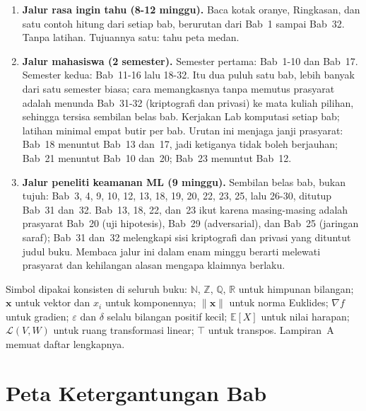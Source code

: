 \documentclass[11pt,a4paper,oneside]{book}
\theoremstyle{definition}
\theoremstyle{plain}
\theoremstyle{remark}
\begin{document}
\begin{enumerate}
  \item \textbf{Jalur rasa ingin tahu (8-12 minggu).} Baca kotak oranye, Ringkasan,
        dan satu contoh hitung dari setiap bab, berurutan dari Bab~1 sampai Bab~32.
        Tanpa latihan. Tujuannya satu: tahu peta medan.
  \item \textbf{Jalur mahasiswa (2 semester).} Semester pertama: Bab~1-10 dan
        Bab~17. Semester kedua: Bab~11-16 lalu 18-32. Itu dua puluh satu bab, lebih
        banyak dari satu semester biasa; cara memangkasnya tanpa memutus prasyarat
        adalah menunda Bab~31-32 (kriptografi dan privasi) ke mata kuliah pilihan,
        sehingga tersisa sembilan belas bab. Kerjakan Lab komputasi setiap bab;
        latihan minimal empat butir per bab. Urutan ini menjaga janji prasyarat:
        Bab~18 menuntut Bab~13 dan~17, jadi ketiganya tidak boleh berjauhan; Bab~21
        menuntut Bab~10 dan~20; Bab~23 menuntut Bab~12.
  \item \textbf{Jalur peneliti keamanan ML (9 minggu).} Sembilan belas bab, bukan
        tujuh: Bab~3, 4, 9, 10, 12, 13, 18, 19, 20, 22, 23, 25, lalu 26-30, ditutup
        Bab~31 dan~32. Bab~13, 18, 22, dan~23 ikut karena masing-masing adalah
        prasyarat Bab~20 (uji hipotesis), Bab~29 (adversarial), dan Bab~25 (jaringan
        saraf); Bab~31 dan~32 melengkapi sisi kriptografi dan privasi yang dituntut
        judul buku. Membaca jalur ini dalam enam minggu berarti melewati prasyarat
        dan kehilangan alasan mengapa klaimnya berlaku.
\end{enumerate}

Simbol dipakai konsisten di seluruh buku: $\mathbb{N}$, $\mathbb{Z}$, $\mathbb{Q}$,
$\mathbb{R}$ untuk himpunan bilangan; $\mathbf{x}$ untuk vektor dan $x_i$ untuk
komponennya; $\|\mathbf{x}\|$ untuk norma Euklides; $\nabla f$ untuk gradien;
$\varepsilon$ dan $\delta$ selalu bilangan positif kecil; $\mathbb{E}[X]$ untuk
nilai harapan; $\mathcal{L}(V,W)$ untuk ruang transformasi linear; $\top$ untuk
transpos. Lampiran~A memuat daftar lengkapnya.

\chapter*{Peta Ketergantungan Bab}
\end{document}
